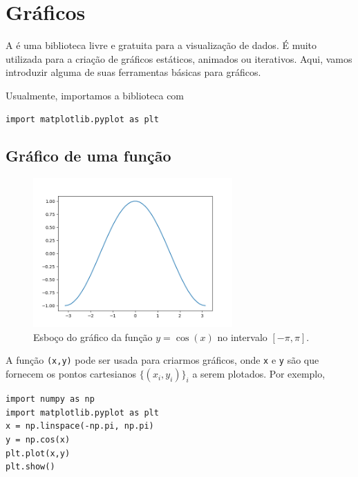 
\section{Gráficos}\label{sec_graf}

A \hl{\PYTHONmatplotlib} é uma biblioteca {\python} livre e gratuita para a visualização de dados. É muito utilizada para a criação de gráficos estáticos, animados ou iterativos. Aqui, vamos introduzir alguma de suas ferramentas básicas para gráficos.

Usualmente, importamos a biblioteca com

\begin{lstlisting}
import matplotlib.pyplot as plt
\end{lstlisting}

\subsection{Gráfico de uma função}\label{sec_graf_ssec_fun}

\begin{figure}[h]
  \centering
  \includegraphics[width=3in]{sec_grafico/data/sen.png}
  \caption{Esboço do gráfico da função $y=\cos(x)$ no intervalo $[-\pi,\pi]$.}
  \label{fig:sen}
\end{figure}

A função {\PYTHONmatplotlibDOTpyplotDOTplot}\texttt{(x,y)} pode ser usada para criarmos gráficos, onde \texttt{x} e \texttt{y} são {\PYTHONnumpyDOTarrays} que fornecem os pontos cartesianos $\{(x_i, y_i)\}_{i}$ a serem plotados. Por exemplo,

\begin{lstlisting}
import numpy as np
import matplotlib.pyplot as plt
x = np.linspace(-np.pi, np.pi)
y = np.cos(x)
plt.plot(x,y)
plt.show()
\end{lstlisting}

